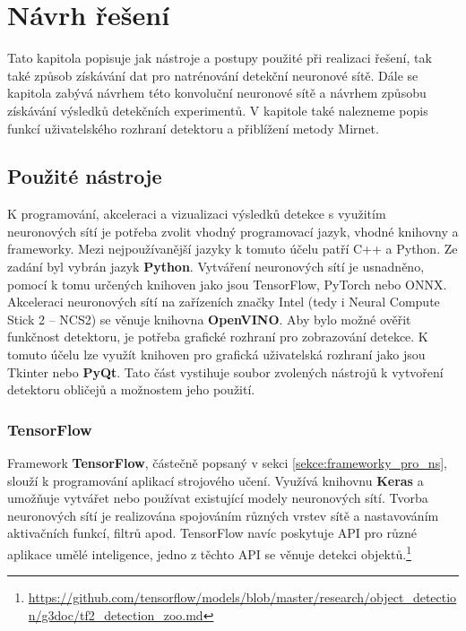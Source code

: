 \chapter{Návrh řešení}
\label{kapitola:navrh}
Tato kapitola popisuje jak nástroje a postupy použité při realizaci řešení, tak také způsob získávání dat pro natrénování detekční neuronové sítě. Dále se kapitola zabývá návrhem této konvoluční neuronové sítě a návrhem způsobu získávání výsledků detekčních experimentů. V kapitole také nalezneme popis funkcí uživatelského rozhraní detektoru a přiblížení metody Mirnet.

\section{Použité nástroje}
\label{sekce:pouzite_nastroje}
K programování, akceleraci a vizualizaci výsledků detekce s využitím neuronových sítí je potřeba zvolit vhodný programovací jazyk, vhodné knihovny a frameworky. Mezi nejpoužívanější jazyky k tomuto účelu patří C++ a Python. Ze zadání byl vybrán jazyk \textbf{Python}. Vytváření neuronových sítí je usnadněno, pomocí k tomu určených knihoven jako jsou TensorFlow, PyTorch nebo ONNX. Akceleraci neuronových sítí na zařízeních značky Intel (tedy i Neural Compute Stick 2 -- NCS2) se věnuje knihovna \textbf{OpenVINO}. Aby bylo možné ověřit funkčnost detektoru, je potřeba grafické rozhraní pro zobrazování detekce. K tomuto účelu lze využít knihoven pro grafická uživatelská rozhraní jako jsou Tkinter nebo \textbf{PyQt}. Tato část vystihuje soubor zvolených nástrojů k vytvoření detektoru obličejů a možnostem jeho použití.

\subsection*{TensorFlow}
Framework \textbf{TensorFlow}, částečně popsaný v sekci \ref{sekce:frameworky_pro_ns}, slouží k programování aplikací strojového učení. Využívá knihovnu \textbf{Keras} a umožňuje vytvářet nebo používat existující modely neuronových sítí. Tvorba neuronových sítí je realizována spojováním různých vrstev sítě a nastavováním aktivačních funkcí, filtrů apod.
TensorFlow navíc poskytuje API pro různé aplikace umělé inteligence, jedno z těchto API se věnuje detekci objektů.\footnote{\url{https://github.com/tensorflow/models/blob/master/research/object_detection/g3doc/tf2_detection_zoo.md}}

